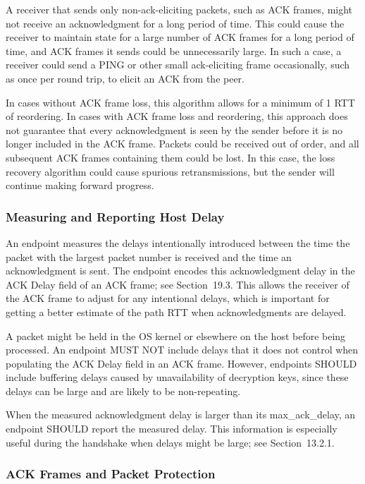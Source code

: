 \documentclass{article}
\begin{document}
A receiver that sends only non-ack-eliciting packets, such as ACK frames, might not receive an acknowledgment for a long period of time.  This could cause the receiver to maintain state for a large number of ACK frames for a long period of time, and ACK frames it sends could be unnecessarily large.  In such a case, a receiver could send a PING or other small ack-eliciting frame occasionally, such as once per round trip, to elicit an ACK from the peer.

In cases without ACK frame loss, this algorithm allows for a minimum of 1 RTT of reordering.  In cases with ACK frame loss and reordering, this approach does not guarantee that every acknowledgment is seen by the sender before it is no longer included in the ACK frame.  Packets could be received out of order, and all subsequent ACK frames containing them could be lost.  In this case, the loss recovery algorithm could cause spurious retransmissions, but the sender will continue making forward progress.

\subsubsection{Measuring and Reporting Host Delay}

An endpoint measures the delays intentionally introduced between the time the packet with the largest packet number is received and the time an acknowledgment is sent.  The endpoint encodes this acknowledgment delay in the ACK Delay field of an ACK frame; see Section~19.3.  This allows the receiver of the ACK frame to adjust for any intentional delays, which is important for getting a better estimate of the path RTT when acknowledgments are delayed.

A packet might be held in the OS kernel or elsewhere on the host before being processed.  An endpoint MUST NOT include delays that it does not control when populating the ACK Delay field in an ACK frame. However, endpoints SHOULD include buffering delays caused by unavailability of decryption keys, since these delays can be large and are likely to be non-repeating.

When the measured acknowledgment delay is larger than its max\_ack\_delay, an endpoint SHOULD report the measured delay.  This information is especially useful during the handshake when delays might be large; see Section~13.2.1.

\subsubsection{ACK Frames and Packet Protection}
\end{document}
